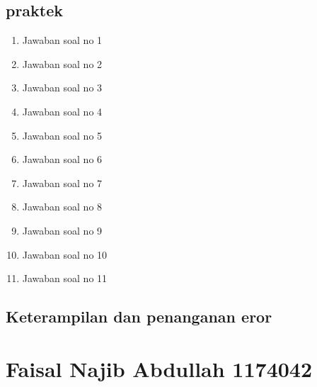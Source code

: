 \subsection{praktek}
\begin{enumerate}
    \item Jawaban soal no 1
    
    \item Jawaban soal no 2
    
    \item Jawaban soal no 3
    
    \item Jawaban soal no 4
    
    \item Jawaban soal no 5
    
    \item Jawaban soal no 6
    
    \item Jawaban soal no 7
    
    \item Jawaban soal no 8
    
    \item Jawaban soal no 9
    
    \item Jawaban soal no 10
    
    \item Jawaban soal no 11
    
\end{enumerate}

\subsection{Keterampilan dan penanganan eror}
    


\section{Faisal Najib Abdullah 1174042}
